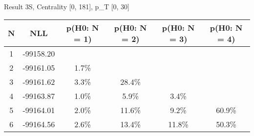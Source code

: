 Result 3S, Centrality [0, 181], p_{T} [0, 30]
\begin{table}[h!]
	\centering
	\begin{tabular}{cc||cccc}
		N & NLL & p(H0: N = 1) & p(H0: N = 2) & p(H0: N = 3) & p(H0: N = 4)\\ 
		\hline
1 & -99158.20 & & & & \\
2 & -99161.05 & 1.7\% & & & \\
3 & -99161.62 & 3.3\% & 28.4\% & & \\
4 & -99163.87 & 1.0\% & 5.9\% & 3.4\% & \\
5 & -99164.01 & 2.0\% & 11.6\% & 9.2\% & 60.9\% \\
6 & -99164.56 & 2.6\% & 13.4\% & 11.8\% & 50.3\% \\
	\end{tabular}
	\label{tab:lab}
\end{table}

